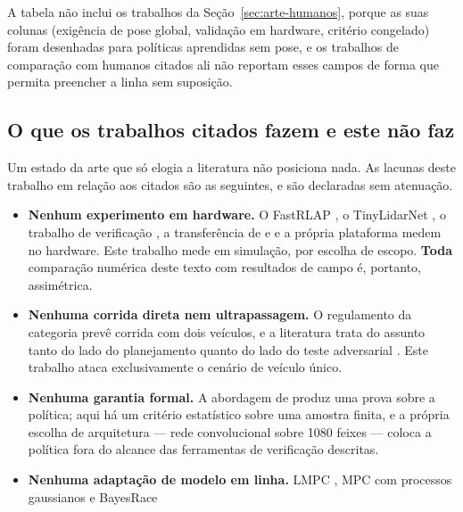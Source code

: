 A tabela não inclui os trabalhos da Seção~\ref{sec:arte-humanos}, porque as suas
colunas (exigência de pose global, validação em hardware, critério congelado)
foram desenhadas para políticas aprendidas sem pose, e os trabalhos de comparação
com humanos citados ali não reportam esses campos de forma que permita preencher
a linha sem suposição.

\subsection{O que os trabalhos citados fazem e este não faz}

Um estado da arte que só elogia a literatura não posiciona nada. As lacunas deste
trabalho em relação aos citados são as seguintes, e são declaradas sem atenuação.

\begin{itemize}
    \item \textbf{Nenhum experimento em hardware.} O FastRLAP
          \cite{Stachowicz2023FastRLAP}, o TinyLidarNet
          \cite{Zarrar2024TinyLidarNet}, o trabalho de verificação
          \cite{Ivanov2020Verifying}, a transferência de
          \cite{Chisari2021LearningSim} e \cite{Brunnbauer2022Latent} e a
          própria plataforma \cite{OKelly2020F1TENTH} medem no hardware. Este
          trabalho mede em simulação, por escolha de escopo.
          \textbf{Toda} comparação numérica deste texto com resultados de campo
          é, portanto, assimétrica.
    \item \textbf{Nenhuma corrida direta nem ultrapassagem.} O regulamento da
          categoria \cite{F1TENTHRules2023} prevê corrida com dois veículos, e a
          literatura trata do assunto tanto do lado do planejamento quanto do
          lado do teste adversarial \cite{Bak2021Stress, Betz2022Survey}. Este
          trabalho ataca exclusivamente o cenário de veículo único.
    \item \textbf{Nenhuma garantia formal.} A abordagem de
          \cite{Ivanov2020Verifying} produz uma prova sobre a política; aqui há
          um critério estatístico sobre uma amostra finita, e a própria escolha
          de arquitetura --- rede convolucional sobre 1080 feixes --- coloca a
          política fora do alcance das ferramentas de verificação descritas.
    \item \textbf{Nenhuma adaptação de modelo em linha.} LMPC
          \cite{Rosolia2020LMPC, Wang2020LMPC}, MPC com processos gaussianos
          \cite{Kabzan2019LearningMPC} e BayesRace \cite{Jain2020Bayesrace}

\end{itemize}
